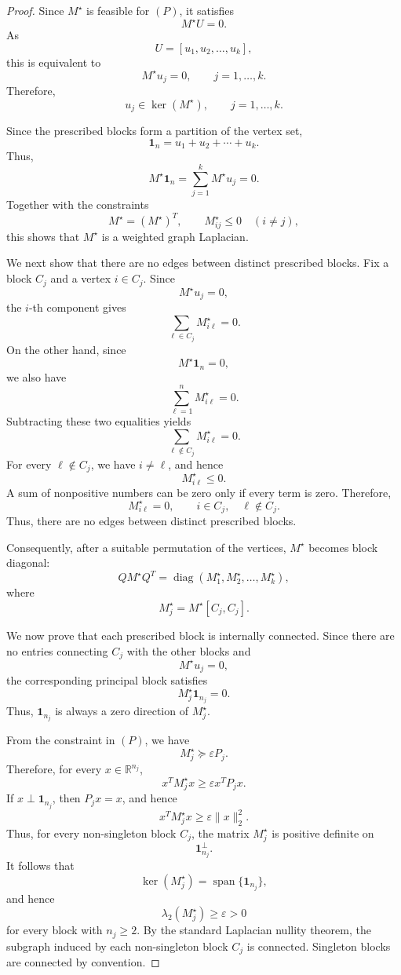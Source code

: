\documentclass[10pt,a4paper]{amsart}
\begin{document}
\begin{proof}
	Since $M^\star$ is feasible for $(P)$, it satisfies
	\[
	M^\star U=0.
	\]
	As
	\[
	U=[u_1,u_2,\ldots,u_k],
	\]
	this is equivalent to
	\[
	M^\star u_j=0,\qquad j=1,\ldots,k.
	\]
	Therefore,
	\[
	u_j\in\ker(M^\star),\qquad j=1,\ldots,k.
	\]
	
	Since the prescribed blocks form a partition of the vertex set,
	\[
	\mathbf 1_n=u_1+u_2+\cdots+u_k.
	\]
	Thus,
	\[
	M^\star\mathbf 1_n
	=
	\sum_{j=1}^{k}M^\star u_j
	=
	0.
	\]
	Together with the constraints
	\[
	M^\star=(M^\star)^T,
	\qquad
	M^\star_{ij}\le0\quad (i\ne j),
	\]
	this shows that $M^\star$ is a weighted graph Laplacian.
	
	We next show that there are no edges between distinct prescribed blocks. Fix a block $C_j$ and a vertex $i\in C_j$. Since
	\[
	M^\star u_j=0,
	\]
	the $i$-th component gives
	\[
	\sum_{\ell\in C_j}M^\star_{i\ell}=0.
	\]
	On the other hand, since
	\[
	M^\star\mathbf 1_n=0,
	\]
	we also have
	\[
	\sum_{\ell=1}^{n}M^\star_{i\ell}=0.
	\]
	Subtracting these two equalities yields
	\[
	\sum_{\ell\notin C_j}M^\star_{i\ell}=0.
	\]
	For every $\ell\notin C_j$, we have $i\ne \ell$, and hence
	\[
	M^\star_{i\ell}\le0.
	\]
	A sum of nonpositive numbers can be zero only if every term is zero. Therefore,
	\[
	M^\star_{i\ell}=0,
	\qquad
	i\in C_j,\quad \ell\notin C_j.
	\]
	Thus, there are no edges between distinct prescribed blocks.
	
	Consequently, after a suitable permutation of the vertices, $M^\star$ becomes block diagonal:
	\[
	Q M^\star Q^T
	=
	\operatorname{diag}(M^\star_1,M^\star_2,\ldots,M^\star_k),
	\]
	where
	\[
	M^\star_j=M^\star[C_j,C_j].
	\]
	
	We now prove that each prescribed block is internally connected. Since there are no entries connecting $C_j$ with the other blocks and
	\[
	M^\star u_j=0,
	\]
	the corresponding principal block satisfies
	\[
	M^\star_j\mathbf 1_{n_j}=0.
	\]
	Thus, $\mathbf 1_{n_j}$ is always a zero direction of $M^\star_j$.
	
	From the constraint in $(P)$, we have
	\[
	M^\star_j\succeq \varepsilon P_j.
	\]
	Therefore, for every $x\in\mathbb R^{n_j}$,
	\[
	x^TM^\star_jx\ge \varepsilon x^TP_jx.
	\]
	If $x\perp \mathbf 1_{n_j}$, then $P_jx=x$, and hence
	\[
	x^TM^\star_jx\ge \varepsilon\|x\|_2^2.
	\]
	Thus, for every non-singleton block $C_j$, the matrix $M^\star_j$ is positive definite on
	\[
	\mathbf 1_{n_j}^{\perp}.
	\]
	It follows that
	\[
	\ker(M^\star_j)=\operatorname{span}\{\mathbf 1_{n_j}\},
	\]
	and hence
	\[
	\lambda_2(M^\star_j)\ge\varepsilon>0
	\]
	for every block with $n_j\ge2$. By the standard Laplacian nullity theorem, the subgraph induced by each non-singleton block $C_j$ is connected. Singleton blocks are connected by convention.
	

\end{proof}
\end{document}
